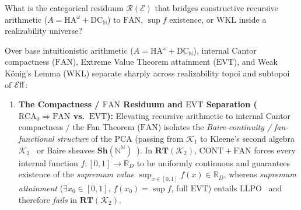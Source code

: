 What is the categorical residuum $\mathcal{R}(\mathcal{E})$ that bridges constructive recursive arithmetic ($A = \mathrm{HA}^\omega + \mathrm{DC}_{\mathbb{N}}$) to $\mathrm{FAN}$, $\sup f$ existence, or $\mathrm{WKL}$ inside a realizability universe?

\begin{theorem}\label{thm:realizability-fan-wkl}%
%
Over base intuitionistic arithmetic ($A = \mathrm{HA}^\omega + \mathrm{DC}_{\mathbb{N}}$), internal Cantor compactness ($\mathrm{FAN}$), Extreme Value Theorem attainment ($\mathrm{EVT}$), and Weak K\"onig's Lemma ($\mathrm{WKL}$) separate sharply across realizability topoi and subtopoi of $\mathcal{E}\mathrm{ff}$:
\begin{enumerate}

  \item \textbf{The Compactness / $\mathrm{FAN}$ Residuum and $\mathrm{EVT}$ Separation ($\mathrm{RCA}_0 \Rightarrow \mathrm{FAN}$ vs.\ $\mathrm{EVT}$):} Elevating recursive arithmetic to internal Cantor compactness / the Fan Theorem ($\mathrm{FAN}$) isolates the \emph{Baire-continuity / fan-functional structure} of the PCA (passing from $\mathcal{K}_1$ to Kleene's second algebra $\mathcal{K}_2$~\cite[\S 4.3]{vanOosten08} or Baire sheaves $\mathbf{Sh}(\mathbb{N}^{\mathbb{N}})$~\cite[Thm.~3.2]{FourmanHyland79}). In $\mathbf{RT}(\mathcal{K}_2)$, $\mathrm{CONT} + \mathrm{FAN}$ forces every internal function $f : [0,1] \to \mathbb{R}_D$ to be uniformly continuous and guarantees existence of the \emph{supremum value} $\sup_{x \in [0,1]} f(x) \in \mathbb{R}_D$, whereas \emph{supremum attainment} ($\exists x_0 \in [0,1],\, f(x_0) = \sup f$, full $\mathrm{EVT}$) entails $\mathrm{LLPO}$~\cite[Ch.~2]{BridgesRichman87} and therefore \emph{fails} in $\mathbf{RT}(\mathcal{K}_2)$.


\end{enumerate}
\end{theorem}
